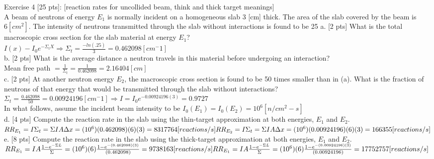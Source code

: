 \documentclass[12pt,fleqn, parskip=full]{scrartcl}
\begin{document}
Exercise 4 [25 pts]: [reaction rates for uncollided beam, think and thick target meanings]\\
A beam of neutrons of energy $E_1$ is normally incident on a homogeneous slab $3$ [cm] thick. The area of the slab covered by the beam is $6 [cm^2]$. The intensity of neutrons transmitted through the slab without interactions is found to be 25%
a. [2 pts] What is the total macroscopic cross section for the slab material at energy $E_1$?\\
$I(x) - I_0 e^{-\Sigma_t X} \Rightarrow \Sigma_t = \frac{-ln(.25)}{3} = 0.462098 [cm^-1]$\\

b. [2 pts] What is the average distance a neutron travels in this material before undergoing an interaction?\\
Mean free path $= \frac{1}{\Sigma_t} = \frac{1}{0.462098} = 2.16404 [cm]$\\

c. [2 pts] At another neutron energy $E_2$, the macroscopic cross section is found to be 50 times smaller than in (a). What is the fraction of neutrons of that energy that would be transmitted through the slab without interactions?\\
$\Sigma_t = \frac{0.462098}{50} = 0.00924196 [cm^-1] \Rightarrow I = I_0 e^{-0.00924196(3)} = 0.9727$\\ 

In what follows, assume the incident beam intensity to be $I_0(E_1) = I_0(E_2) = 10^6 [n/cm^2-s] $ \\
d. [4 pts] Compute the reaction rate in the slab using the thin-target approximation at both energies, $E_1$ and $E_2$.\\
$RR_{E_1} = I\Sigma_t = \Sigma IA\Delta x = (10^6)(0.462098)(6)(3) = 8317764 [reactions/s]\\
RR_{E_2} = I\Sigma_t = \Sigma IA\Delta x = (10^6)(0.00924196)(6)(3) = 166355 [reactions/s]$\\

e. [8 pts] Compute the reaction rate in the slab using the thick-target approximation at both energies, $E_1$ and $E_2$.\\
$RR_{E_1} = IA\frac{1-e^{-\Sigma L}}{\Sigma} = (10^6)(6)\frac{1-e^{-(0.462098)(3)}}{(0.462098)} = 9738163 [reactions/s]\\
RR_{E_1} = IA\frac{1-e^{-\Sigma L}}{\Sigma} = (10^6)(6)\frac{1-e^{-(0.00924196)(3)}}{(0.00924196)} = 17752757 [reactions/s]$\\
\end{document}

